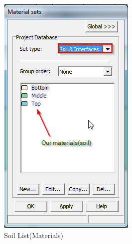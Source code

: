 \break
\begin{landscape}
\begin{figure}[hbtp]
  \centering
  \hfill
  \begin{minipage}[c]{0.4\linewidth}
  \includegraphics[width=\linewidth, height=\textheight,keepaspectratio]{images/plx/a (3).png}
  \caption{Soil List(Materials)}
  \end{minipage}
  \hfill
  \begin{minipage}[c]{0.4\linewidth}

\end{minipage}
\end{figure}
\end{landscape}
